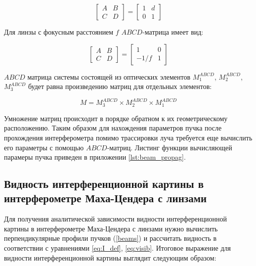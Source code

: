 \begin{equation}
    \begin{bmatrix} A & B \\ C & D \end{bmatrix}=\begin{bmatrix} 1 & d \\ 0 & 1 \end{bmatrix}
\label{eq:abcd_free}
\end{equation}

Для линзы с фокусным расстоянием $f$ $ABCD$-матрица имеет вид: 

\begin{equation}
    \begin{bmatrix} A & B \\ C & D \end{bmatrix}=\begin{bmatrix} 1 & 0 \\ -1/f & 1 \end{bmatrix}
\label{eq:abcd_lens}
\end{equation}

$ABCD$ матрица системы состоящей из оптических элементов $M_1^{ABCD}$, $M_2^{ABCD}$, $M_3^{ABCD}$ будет равна произведению матриц для отдельных элементов:

\begin{equation}
    M = M_3^{ABCD} \times M_2^{ABCD} \times M_1^{ABCD}
\label{eq:abcd_prod}
\end{equation}

Умножение матриц происходит в порядке обратном к их геометрическому расположению. Таким образом для нахождения параметров пучка после прохождения интерферометра помимо трассировки луча требуется еще вычислить его параметры с помощью $ABCD$-матриц. Листинг функции вычисляющей парамеры пучка приведен в приложении \ref{lst:beam_propag}.

\subsection{Видность интерференционной картины в интерферометре Маха-Цендера с линзами}\label{sec:ch2/sec1/subsec5}

Для получения аналитической зависимости видности интерференционной картины в интерферометре Маха-Цендера с линзами нужно вычислить перпендикулярные профили пучков  (\ref{beams}) и рассчитать видность в соответствии с уравнениями \eqref{eq:I_def}, \eqref{eq:visib}. Итоговое выражение для видности интерференционной картины выглядит следующим образом:

